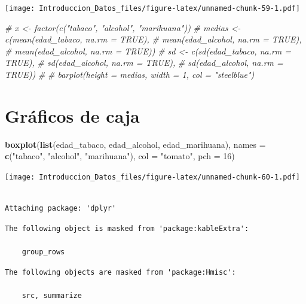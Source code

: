\documentclass[spanish,]{book}
\newenvironment{Shaded}{\begin{snugshade}}{\end{snugshade}}
\newcommand{\KeywordTok}[1]{\textcolor[rgb]{0.13,0.29,0.53}{\textbf{#1}}}
\newcommand{\DataTypeTok}[1]{\textcolor[rgb]{0.13,0.29,0.53}{#1}}
\newcommand{\DecValTok}[1]{\textcolor[rgb]{0.00,0.00,0.81}{#1}}
\newcommand{\StringTok}[1]{\textcolor[rgb]{0.31,0.60,0.02}{#1}}
\newcommand{\CommentTok}[1]{\textcolor[rgb]{0.56,0.35,0.01}{\textit{#1}}}
\newcommand{\NormalTok}[1]{#1}
\begin{document}
\texttt{[image: Introduccion\_Datos\_files/figure-latex/unnamed-chunk-59-1.pdf]}

\begin{Shaded}
\begin{Highlighting}[]
\CommentTok{# x <- factor(c("tabaco", "alcohol", "marihuana"))}
\CommentTok{# medias <- c(mean(edad_tabaco, na.rm = TRUE),}
\CommentTok{#             mean(edad_alcohol, na.rm = TRUE),}
\CommentTok{#             mean(edad_alcohol, na.rm = TRUE))}
\CommentTok{# sd <- c(sd(edad_tabaco, na.rm = TRUE),}
\CommentTok{#         sd(edad_alcohol, na.rm = TRUE),}
\CommentTok{#         sd(edad_alcohol, na.rm = TRUE))}
\CommentTok{# }
\CommentTok{# barplot(height = medias, width = 1, col = "steelblue")}
\end{Highlighting}
\end{Shaded}

\section{Gráficos de caja}\label{graficos-de-caja}

\begin{Shaded}
\begin{Highlighting}[]
\KeywordTok{boxplot}\NormalTok{(}\KeywordTok{list}\NormalTok{(edad_tabaco, edad_alcohol, edad_marihuana),}
        \DataTypeTok{names =} \KeywordTok{c}\NormalTok{(}\StringTok{"tabaco"}\NormalTok{, }\StringTok{"alcohol"}\NormalTok{, }\StringTok{"marihuana"}\NormalTok{),}
        \DataTypeTok{col =} \StringTok{"tomato"}\NormalTok{,}
        \DataTypeTok{pch =} \DecValTok{16}\NormalTok{)}
\end{Highlighting}
\end{Shaded}

\texttt{[image: Introduccion\_Datos\_files/figure-latex/unnamed-chunk-60-1.pdf]}

\begin{verbatim}

Attaching package: 'dplyr'
\end{verbatim}

\begin{verbatim}
The following object is masked from 'package:kableExtra':

    group_rows
\end{verbatim}

\begin{verbatim}
The following objects are masked from 'package:Hmisc':

    src, summarize
\end{verbatim}
\end{document}
